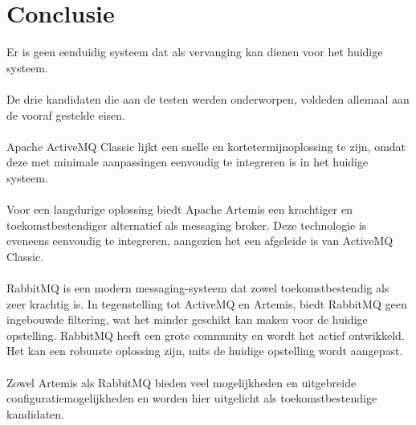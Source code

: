 
\chapter{Conclusie}%
\label{ch:conclusie}


Er is geen eenduidig systeem dat als vervanging kan dienen voor het huidige systeem.
\\\\
De drie kandidaten die aan de testen werden onderworpen, voldeden allemaal aan de vooraf gestelde eisen.
\\\\
Apache ActiveMQ Classic lijkt een snelle en kortetermijnoplossing te zijn, 
omdat deze met minimale aanpassingen eenvoudig te integreren is in het huidige systeem.
\\\\
Voor een langdurige oplossing biedt Apache Artemis een krachtiger en toekomstbestendiger alternatief als messaging broker. 
Deze technologie is eveneens eenvoudig te integreren, aangezien het een afgeleide is van ActiveMQ Classic.
\\\\
RabbitMQ is een modern messaging-systeem dat zowel toekomstbestendig als zeer krachtig is. 
In tegenstelling tot ActiveMQ en Artemis, biedt RabbitMQ geen ingebouwde filtering, wat het minder geschikt kan maken voor de huidige opstelling.
RabbitMQ heeft een grote community en wordt het actief ontwikkeld. Het kan een robuuste oplossing zijn, 
mits de huidige opstelling wordt aangepast.
\\\\
Zowel Artemis als RabbitMQ bieden veel mogelijkheden en uitgebreide configuratiemogelijkheden en worden hier uitgelicht als toekomstbestendige kandidaten.


